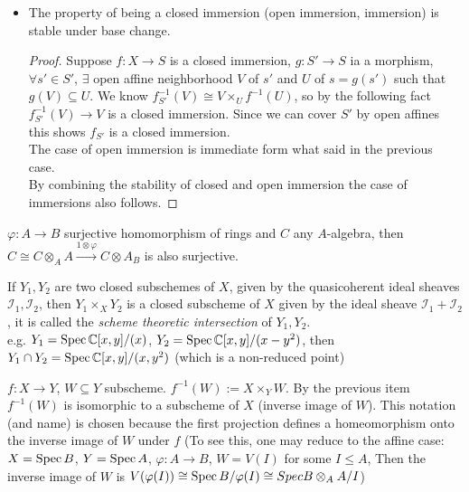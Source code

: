 \documentclass[main]{subfiles}
\begin{document}
\begin{itemize}
\item The property of being a closed immersion (open immersion, immersion) is stable under base change.
\begin{proof}
Suppose $f:X\to S$ is a closed immersion, $g:S'\to S$ ia a morphism, $\forall s'\in S'$, $\exists$ open affine neighborhood $V$ of $s'$ and $U$ of $s=g(s')$ such that $g(V)\subseteq U$. We know $f^{-1}_{S'}(V)\cong V\times_Uf^{-1}(U)$, so by the following fact $f^{-1}_{S'}(V)\to V$ is a closed immersion. Since we can cover $S'$ by open affines this shows $f_{S'}$ is a closed immersion. \\
The case of open immersion is immediate form what said in the previous case. \\
By combining the stability of closed and open immersion the case of immersions also follows.
\end{proof}
\end{itemize}

\begin{fact}
$\varphi:A\to B$ surjective homomorphism of rings and $C$ any $A$-algebra, then $C\cong C\otimes_AA\xrightarrow{1\otimes\varphi}C\otimes A_B$ is also surjective.
\end{fact}

\begin{example}
If $Y_1,Y_2$ are two closed subschemes of $X$, given by the quasicoherent ideal sheaves $\mathcal I_1,\mathcal I_2$, then $Y_1\times_XY_2$ is a closed subscheme of $X$ given by the ideal sheave $\mathcal I_1+\mathcal I_2$, it is called the \textit{scheme theoretic intersection} of $Y_1,Y_2$. \\
e.g. $Y_1=\operatorname{Spec} \mathbb C[x,y]/(x)$, $Y_2=\operatorname{Spec} \mathbb C[x,y]/(x-y^2)$, then $Y_1\cap Y_2=\operatorname{Spec} \mathbb C[x,y]/(x,y^2)$ (which is a non-reduced point)
\end{example}

\begin{definition}
$f:X\to Y$, $W\subseteq Y$ subscheme. $f^{-1}(W):=X\times_YW$. By the previous item $f^{-1}(W)$ is isomorphic to a subscheme of $X$ (inverse image of $W$). This notation (and name) is chosen because the first projection defines a homeomorphism onto the inverse image of $W$ under $f$ (To see this, one may reduce to the affine case: $X=\operatorname{Spec} B$, $Y=\operatorname{Spec} A$, $\varphi:A\to B$, $W=V(I)$ for some $I\leq A$, Then the inverse image of $W$ is $V(\varphi(I))\cong \operatorname{Spec} B/\varphi(I)\cong Spec B\otimes_AA/I$)
\end{definition}
\end{document}
